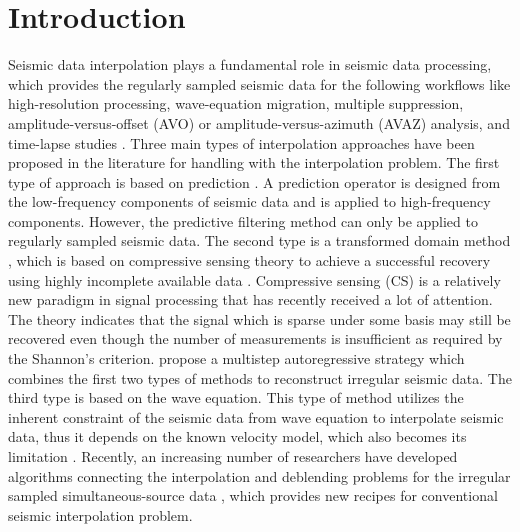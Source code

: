 \section{Introduction}
Seismic data interpolation plays a fundamental role in seismic data processing, which provides the regularly sampled seismic data for the following workflows like high-resolution processing, wave-equation migration, multiple suppression, amplitude-versus-offset (AVO) or amplitude-versus-azimuth (AVAZ) analysis, and time-lapse studies \cite[]{chiu2014,yangkang2015shape,benfeng2015,shuwei2015seg,zhongwei2016,zhangdong2016}. Three main types of interpolation approaches have been proposed in the literature for handling with the interpolation problem. The first type of approach is based on prediction \cite[]{spitz1991,porsani1999}. A prediction operator is designed from the low-frequency components of seismic data and is applied to high-frequency components. However, the predictive filtering method can only be applied to regularly sampled seismic data. The second type is a transformed domain method \cite[]{candes20061,yangkang20142,shuwei,liuwei2015}, which is based on compressive sensing theory \cite[]{candes20062,donoho2006} to achieve a successful recovery using highly incomplete available data \cite[]{sacchi1998,wang2003,yangkang2014halfthr}.  Compressive sensing (CS) is a relatively new paradigm \cite[]{candes20062,donoho2006,donoho20061,shuwei20164,liuwei20162} in signal processing that has recently received a lot of attention. The theory indicates that the signal which is sparse under some basis may still be recovered even though the number of measurements is insufficient as required by the Shannon's criterion. \cite{mostafa2007} propose a multistep autoregressive strategy which combines the first two types of methods to reconstruct irregular seismic data. The third type is based on the wave equation. This type of method utilizes the inherent constraint of the seismic data from wave equation to interpolate seismic data, thus it depends on the known velocity model, which also becomes its limitation \cite[]{canning1996,fomel2003}. Recently, an increasing number of researchers have developed algorithms connecting the interpolation and deblending \cite[]{berkhout2008} problems for the irregular sampled simultaneous-source data \cite[]{chengbo2013}, which provides new recipes for conventional seismic interpolation problem. 

